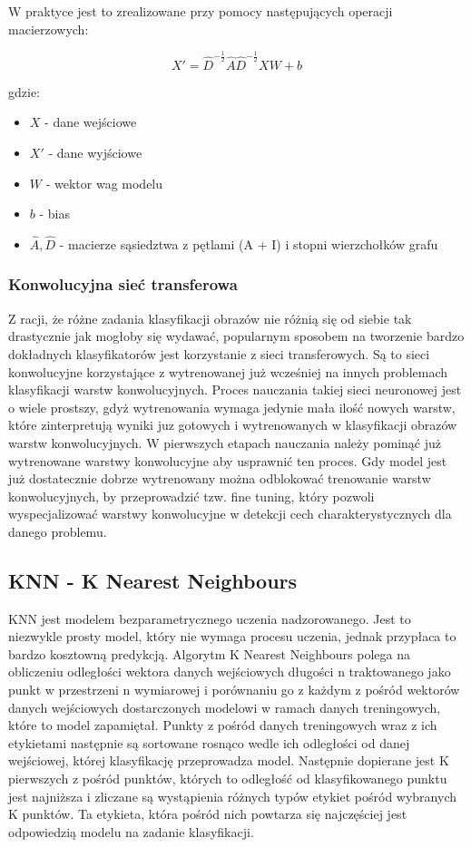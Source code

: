 \documentclass{article}
\begin{document}
W praktyce jest to zrealizowane przy pomocy następujących operacji macierzowych:

\begin{equation}
    X' = \hat{D}^{-\frac{1}{2}} \hat{A} \hat{D}^{-\frac{1}{2}} X W + b
\end{equation}

gdzie: 
\begin{itemize}
    \item $X$ - dane wejściowe
    \item $X'$ - dane wyjściowe
    \item $W$ - wektor wag modelu
    \item $b$ - bias
    \item $\hat{A}, \hat{D}$ - macierze sąsiedztwa z pętlami (A + I) i stopni 
    wierzchołków grafu
\end{itemize}

\subsubsection{Konwolucyjna sieć transferowa}
Z racji, że różne zadania klasyfikacji obrazów nie różnią się od siebie tak drastycznie jak 
mogłoby się wydawać, popularnym sposobem na tworzenie bardzo dokładnych 
klasyfikatorów jest korzystanie z sieci transferowych. Są to sieci konwolucyjne korzystające 
z wytrenowanej już wcześniej na innych problemach klasyfikacji warstw konwolucyjnych. 
Proces nauczania takiej sieci neuronowej jest o wiele prostszy, gdyż wytrenowania wymaga 
jedynie mała ilość nowych warstw, które zinterpretują wyniki juz gotowych i wytrenowanych 
w klasyfikacji obrazów warstw konwolucyjnych. W pierwszych etapach nauczania należy pominąć 
już wytrenowane warstwy konwolucyjne aby usprawnić ten proces. Gdy model jest już dostatecznie 
dobrze wytrenowany można odblokować trenowanie warstw konwolucyjnych, by przeprowadzić tzw. 
fine tuning, który pozwoli wyspecjalizować warstwy konwolucyjne w detekcji cech charakterystycznych 
dla danego problemu. 


\subsection{KNN - K Nearest Neighbours}
KNN jest modelem bezparametrycznego uczenia nadzorowanego. Jest to niezwykle prosty model,
 który nie wymaga procesu uczenia, jednak przypłaca to bardzo kosztowną predykcją.
Algorytm K Nearest Neighbours polega na obliczeniu odległości wektora danych wejściowych 
długości n traktowanego jako punkt w przestrzeni n wymiarowej i porównaniu go z każdym z 
pośród wektorów danych wejściowych dostarczonych modelowi w ramach danych treningowych, 
które to model zapamiętał. Punkty z pośród danych treningowych wraz z ich etykietami 
następnie są sortowane rosnąco wedle ich odległości od danej wejściowej, której 
klasyfikację przeprowadza model. Następnie dopierane jest K pierwszych z pośród 
punktów, których to odległość od klasyfikowanego punktu jest najniższa i zliczane 
są wystąpienia różnych typów etykiet pośród wybranych K punktów. Ta etykieta, 
która pośród nich powtarza się najczęściej jest odpowiedzią modelu na zadanie klasyfikacji.
\end{document}

